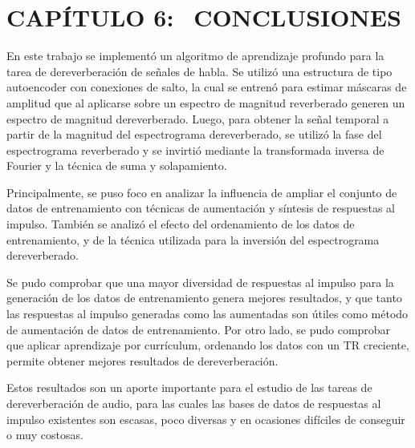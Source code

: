 \section[Conclusiones]{CAPÍTULO 6:$\ \ \ \ $CONCLUSIONES} 

En este trabajo se implementó un algoritmo de aprendizaje profundo para la tarea de dereverberación de señales de habla. Se utilizó una estructura de tipo autoencoder con conexiones de salto, la cual se entrenó para estimar máscaras de amplitud que al aplicarse sobre un espectro de magnitud reverberado generen un espectro de magnitud dereverberado. Luego, para obtener la señal temporal a partir de la magnitud del espectrograma dereverberado, se utilizó la fase del espectrograma reverberado y se invirtió mediante la transformada inversa de Fourier y la técnica de suma y solapamiento.
 
Principalmente, se puso foco en analizar la influencia de ampliar el conjunto de datos de entrenamiento con técnicas de aumentación y síntesis de respuestas al impulso. También se analizó el efecto del ordenamiento de los datos de entrenamiento, y de la técnica utilizada para la inversión del espectrograma dereverberado.

Se pudo comprobar que una mayor diversidad de respuestas al impulso para la generación de los datos de entrenamiento genera mejores resultados, y que tanto las respuestas al impulso generadas como las aumentadas son útiles como método de aumentación de datos de entrenamiento. Por otro lado, se pudo comprobar que aplicar aprendizaje por currículum, ordenando los datos con un TR creciente, permite obtener mejores resultados de dereverberación.
 
Estos resultados son un aporte importante para el estudio de las tareas de dereverberación de audio, para las cuales las bases de datos de respuestas al impulso existentes son escasas, poco diversas y en ocasiones difíciles de conseguir o muy costosas.